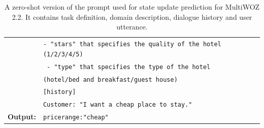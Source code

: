 \begin{table}[tp]
\begin{tabular}{rl}
      & \texttt{{\color{green!100!yellow!70!black!100!}- "stars" that specifies the quality of the hotel (1/2/3/4/5)}} \\
      & \texttt{{\color{green!100!yellow!70!black!100!} - "type" that specifies the type of the hotel}}\\
      & \texttt{{\color{green!100!yellow!70!black!100!}(hotel/bed and breakfast/guest house)}} \\
      & \texttt{{\color{red!100!yellow!70!black!100!}[history] }} \\
      &  \texttt{{\color{orange!50!yellow!90!black!100!}Customer: "I want a cheap place to stay." }}\\
      \midrule
      \textbf{Output:} & \texttt{pricerange:"cheap"}\\
      \bottomrule
  \end{tabular}
  \caption{A zero-shot version of the prompt used for state update prediction for MultiWOZ 2.2.
  It contains {\color{cyan!80!yellow!80!black!100} task definition},  {\color{green!100!yellow!70!black!100!}domain description}, {\color{red!100!yellow!70!black!100!} dialogue history} and {\color{orange!50!yellow!90!black!100!} user utterance}. }
  \label{07_tab:zero-shot-state}
\end{table}

